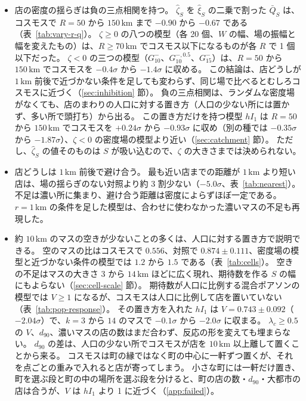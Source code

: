 \documentclass[a4paper,11pt]{ltjsarticle}
\begin{document}
\begin{itemize}
  \item[(i)] 店の密度の揺らぎは負の三点相関を持つ。
    $\hat\zeta_S$ を $\hat\xi_S$ の二乗で割った $\bar Q_S$ は、コスモスで $R = 50$ から $150\,\mathrm{km}$ まで $-0.90$ から $-0.67$ である（表~\ref{tab:vary-r-q}）。
    $\zeta \ge 0$ の八つの模型（各 20 個、$W$ の幅、場の振幅と幅を変えたもの）は、$R \ge 70\,\mathrm{km}$ でコスモス以下になるものが各 $R$ で 1 個以下だった。
    $\zeta < 0$ の三つの模型（$G_{10}^{-}$、$G_{10}^{-,0.5}$、$G_{15}^{-}$）は、$R = 50$ から $150\,\mathrm{km}$ でコスモスを $-0.4\sigma$ から $-1.4\sigma$ に収める。
    この結論は、店どうしが $1\,\mathrm{km}$ 前後で近づかない条件を足しても変わらず、同じ場で比べるとむしろコスモスに近づく（\ref{sec:inhibition} 節）。
    負の三点相関は、ランダムな密度場がなくても、店のまわりの人口に対する置き方（人口の少ない所には置かず、多い所で頭打ち）から出る。
    この置き方だけを持つ模型 $hI_1$ は $R = 50$ から $150\,\mathrm{km}$ でコスモスを $+0.24\sigma$ から $-0.93\sigma$ に収め（別の種では $-0.35\sigma$ から $-1.87\sigma$）、$\zeta < 0$ の密度場の模型より近い（\ref{sec:catchment} 節）。
    ただし、$\hat\zeta_S$ の値そのものは $S$ が吸い込むので、$\zeta$ の大きさまでは決められない。
  \item[(ii)] 店どうしは $1\,\mathrm{km}$ 前後で避け合う。
    最も近い店までの距離が $1\,\mathrm{km}$ より短い店は、場の揺らぎのない対照より約 3 割少ない（$-5.0\sigma$、表~\ref{tab:nearest}）。
    不足は濃い所に集まり、避け合う距離は密度によらずほぼ一定である。
    $r = 1\,\mathrm{km}$ の条件を足した模型は、合わせに使わなかった濃いマスの不足も再現した。
  \item[(iii)] 約 $10\,\mathrm{km}$ のマスの空きが少ないことの多くは、人口に対する置き方で説明できる。
    空のマスの比はコスモスで $0.556$、対照で $0.874 \pm 0.111$、密度場の模型と近づかない条件の模型では $1.2$ から $1.5$ である（表~\ref{tab:cells}）。
    空きの不足はマスの大きさ $3$ から $14\,\mathrm{km}$ ほどに広く現れ、期待数を作る $S$ の幅にもよらない（\ref{sec:cell-scale} 節）。
    期待数が人口に比例する混合ポアソンの模型では $V \ge 1$ になるが、コスモスは人口に比例して店を置いていない（表~\ref{tab:pop-response}）。
    その置き方を入れた $hI_1$ は $V = 0.743 \pm 0.092$（$-2.04\sigma$）で、$k = 3$ から $14$ のマスで $-0.1\sigma$ から $-2.0\sigma$ に収まる。
    $\lambda_c \ge 0.5$ の $V$、$d_{90}$、濃いマスの店の数はまだ合わず、反応の形を変えても埋まらない。
    $d_{90}$ の差は、人口の少ない所でコスモスが店を $10\,\mathrm{km}$ 以上離して置くことから来る。
    コスモスは町の縁ではなく町の中心に一軒ずつ置くが、それを点ごとの重みで入れると店が寄ってしまう。
    小さな町には一軒だけ置き、町を選ぶ段と町の中の場所を選ぶ段を分けると、町の店の数・$d_{90}$・大都市の店は合うが、$V$ は $hI_1$ より 1 に近づく（\ref{app:failed}）。
\end{itemize}
\end{document}
